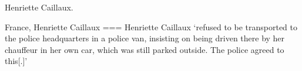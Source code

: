 Henriette Caillaux.

France, Henriette Caillaux
===
Henriette Caillaux ‘refused to be transported to the police headquarters in a police van, insisting on being driven there by her chauffeur in her own car, which was still parked outside. The police agreed to this[.]’
\nocite{2025c}